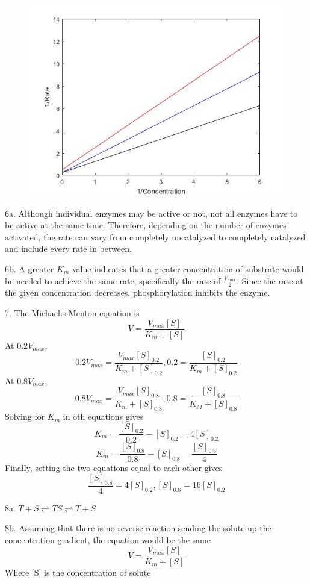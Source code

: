 \documentclass{article}
\begin{document}
\begin{figure}[h]
  \centering
  \includegraphics[scale=0.3]{P5.jpg}
\end{figure}

6a. Although individual enzymes may be active or not, not all enzymes have to be active at the same time. Therefore, depending on the number of enzymes activated, the rate can vary from completely uncatalyzed to completely catalyzed and include every rate in between.

6b. A greater $K_m$ value indicates that a greater concentration of substrate would be needed to achieve the same rate, specifically the rate of $\frac{V_{max}}{2}$. Since the rate at the given concentration decreases, phosphorylation inhibits the enzyme. 

7. The Michaelis-Menton equation is 
$$V=\frac{V_{max}[S]}{K_m +[S]}$$ 
At $0.2V_{max}$, 
$$0.2V_{max}=\frac{V_{max}[S]_{0.2}}{K_m+[S]_{0.2}},0.2=\frac{[S]_{0.2}}{K_m +[S]_{0.2}}$$ At $0.8V_{max}$,
$$0.8V_{max}=\frac{V_{max}[S]_{0.8}}{K_m +[S]_{0.8}},0.8=\frac{[S]_{0.8}}{K_M +[S]_{0.8}}$$
Solving for $K_m$ in oth equations gives 
$$K_m=\frac{[S]_{0.2}}{0.2}-[S]_{0.2}=4[S]_{0.2}$$
$$K_m=\frac{[S]_{0.8}}{0.8}-[S]_{0.8}=\frac{[S]_{0.8}}{4}$$ 
Finally, setting the two equations equal to each other gives 
$$\frac{[S]_{0.8}}{4}=4[S]_{0.2},[S]_{0.8}=16[S]_{0.2}$$

8a. $T+S\rightleftharpoons TS\rightleftharpoons T+S$

8b. Assuming that there is no reverse reaction sending the solute up the concentration gradient, the equation would be the same
$$V=\frac{V_{max}[S]}{K_m +[S]}$$ 
Where [S] is the concentration of solute
\end{document}
